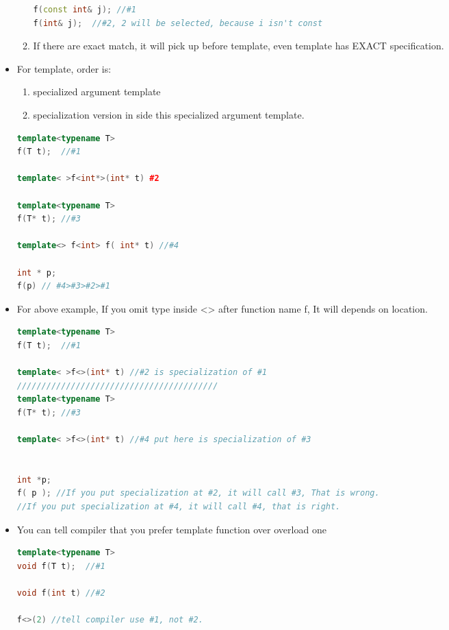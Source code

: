 \documentclass[a4paper,12pt,twoside]{book}
\begin{document}
\begin{itemize}
\begin{enumerate}
\begin{lstlisting}[frame=single, language=c++]
f(const int& j); //#1
f(int& j);  //#2, 2 will be selected, because i isn't const
\end{lstlisting}
\item If there are exact match, it will pick up before template, even template has EXACT specification.
\end{enumerate}

\item For template, order is:
\begin{enumerate}
\item specialized argument template
\item specialization version in side this  specialized argument template.
\end{enumerate}
\begin{lstlisting}[frame=single, language=c++]
template<typename T>
f(T t);  //#1

template< >f<int*>(int* t) #2

template<typename T>
f(T* t); //#3

template<> f<int> f( int* t) //#4

int * p;
f(p) // #4>#3>#2>#1
\end{lstlisting}

\item For above example, If you omit type inside <> after function name f, It will depends on location.
\begin{lstlisting}[frame=single, language=c++]
template<typename T>
f(T t);  //#1

template< >f<>(int* t) //#2 is specialization of #1
/////////////////////////////////////////
template<typename T>
f(T* t); //#3

template< >f<>(int* t) //#4 put here is specialization of #3


int *p; 
f( p ); //If you put specialization at #2, it will call #3, That is wrong.
//If you put specialization at #4, it will call #4, that is right.
\end{lstlisting}

\item You can tell compiler that you prefer template function over overload one

\begin{lstlisting}[frame=single, language=c++]
template<typename T>
void f(T t);  //#1

void f(int t) //#2

f<>(2) //tell compiler use #1, not #2.
\end{lstlisting}

\end{itemize}
\end{document}
